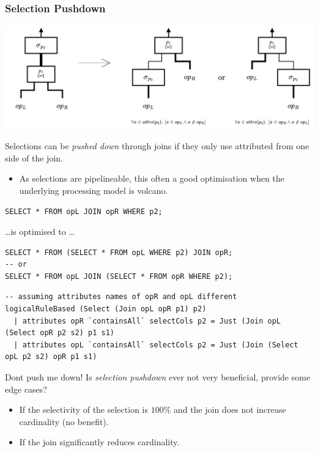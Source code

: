 \subsubsection{Selection Pushdown}
\begin{center}
    \includegraphics[width=.9\textwidth]{optimisation/images/push_down_selection.drawio.png}
\end{center}
Selections can be \textit{pushed down} through joins if they only use attributed from one side of the join.
\begin{itemize}
    \item As selections are pipelineable, this often a good optimisation when the underlying processing model is volcano. 
\end{itemize}
\begin{verbatim}
SELECT * FROM opL JOIN opR WHERE p2;
\end{verbatim}
\dots is optimised to \dots
\begin{verbatim}
SELECT * FROM (SELECT * FROM opL WHERE p2) JOIN opR;
-- or
SELECT * FROM opL JOIN (SELECT * FROM opR WHERE p2);
\end{verbatim}
\begin{verbatim}
-- assuming attributes names of opR and opL different
logicalRuleBased (Select (Join opL opR p1) p2) 
  | attributes opR `containsAll` selectCols p2 = Just (Join opL (Select opR p2 s2) p1 s1)
  | attributes opL `containsAll` selectCols p2 = Just (Join (Select opL p2 s2) opR p1 s1)
\end{verbatim}

\begin{examplebox}{Dont push me down!}
    Is \textit{selection pushdown} ever not very beneficial, provide some edge cases?
    \tcblower
    \begin{itemize}
        \item If the selectivity of the selection is $100\%$ and the join does not increase cardinality (no benefit). 
        \item If the join significantly reduces cardinality. 
    \end{itemize}
    \unfinished
\end{examplebox}

